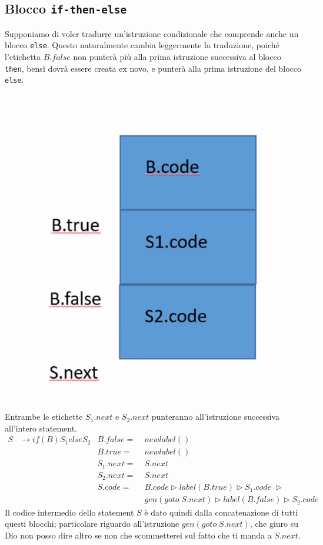 \documentclass[class=book, crop=false, oneside, 12pt]{standalone}
\begin{document}
\subsection{Blocco \texttt{if-then-else}}
Supponiamo di voler tradurre un'istruzione condizionale che comprende anche un blocco \texttt{else}. Questo naturalmente cambia leggermente la traduzione, poiché l'etichetta \(B.false\) non punterà più alla prima istruzione successiva al blocco \texttt{then}, bensì dovrà essere creata ex novo, e punterà alla prima istruzione del blocco \texttt{else}.
\begin{figure}[H]
    \centering
    \includegraphics[width=.4\textwidth]{if-else-trans.png}
    \caption{}
    \label{}
\end{figure}
Entrambe le etichette \(S_1.next\) e \(S_2.next\) punteranno all'istruzione successiva all'intero statement.
\begin{align*}
    S &\to if (B) S_1 else S_2 & B.false =\; &newlabel() \\
    & & B.true =\; &newlabel() \\
    & & S_1.next =\; &S.next \\
    & & S_2.next =\; &S.next \\
    & & S.code =\; &B.code \triangleright label(B.true) \triangleright S_1.code\; \triangleright \\
    & & &gen(goto\; S.next) \triangleright label(B.false) \triangleright S_2.code
\end{align*}
Il codice intermedio dello statement \(S\) è dato quindi dalla concatenazione di tutti questi blocchi; particolare riguardo all'istruzione \(gen(goto\; S.next)\), che giuro su Dio non posso dire altro se non che scommetterei sul fatto che ti manda a \(S.next\).
\end{document}
